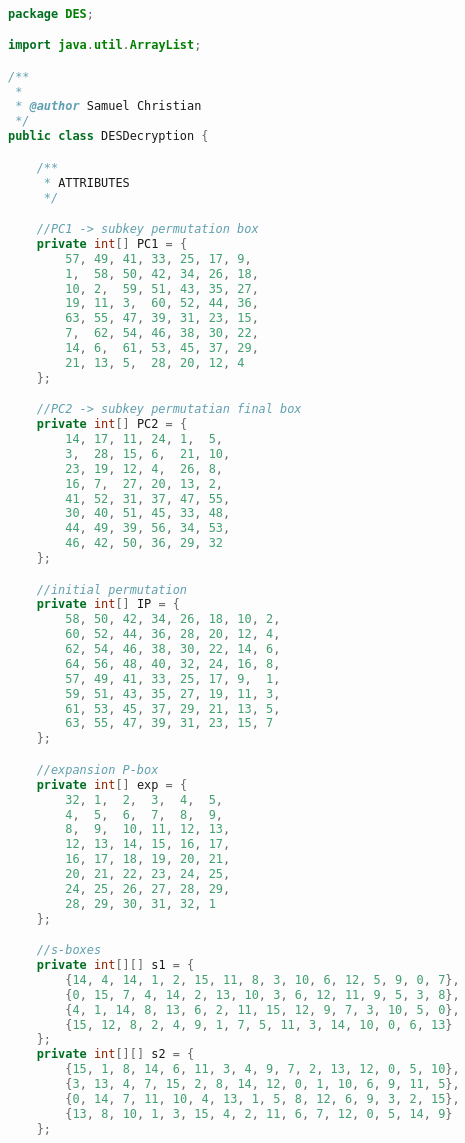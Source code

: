\begin{lstlisting}[language=Java,basicstyle=\tiny,caption=DESDecryption.java]

package DES;

import java.util.ArrayList;

/**
 *
 * @author Samuel Christian
 */
public class DESDecryption {

    /**
     * ATTRIBUTES
     */

    //PC1 -> subkey permutation box
    private int[] PC1 = {
        57, 49, 41, 33, 25, 17, 9,
        1,  58, 50, 42, 34, 26, 18,
        10, 2,  59, 51, 43, 35, 27,
        19, 11, 3,  60, 52, 44, 36,
        63, 55, 47, 39, 31, 23, 15,
        7,  62, 54, 46, 38, 30, 22,
        14, 6,  61, 53, 45, 37, 29,
        21, 13, 5,  28, 20, 12, 4
    };

    //PC2 -> subkey permutatian final box
    private int[] PC2 = {
        14, 17, 11, 24, 1,  5,
        3,  28, 15, 6,  21, 10,
        23, 19, 12, 4,  26, 8,
        16, 7,  27, 20, 13, 2,
        41, 52, 31, 37, 47, 55,
        30, 40, 51, 45, 33, 48,
        44, 49, 39, 56, 34, 53,
        46, 42, 50, 36, 29, 32
    };

    //initial permutation
    private int[] IP = {
        58, 50, 42, 34, 26, 18, 10, 2,
        60, 52, 44, 36, 28, 20, 12, 4,
        62, 54, 46, 38, 30, 22, 14, 6,
        64, 56, 48, 40, 32, 24, 16, 8,
        57, 49, 41, 33, 25, 17, 9,  1,
        59, 51, 43, 35, 27, 19, 11, 3,
        61, 53, 45, 37, 29, 21, 13, 5,
        63, 55, 47, 39, 31, 23, 15, 7
    };

    //expansion P-box
    private int[] exp = {
        32, 1,  2,  3,  4,  5,
        4,  5,  6,  7,  8,  9,
        8,  9,  10, 11, 12, 13,
        12, 13, 14, 15, 16, 17,
        16, 17, 18, 19, 20, 21,
        20, 21, 22, 23, 24, 25,
        24, 25, 26, 27, 28, 29,
        28, 29, 30, 31, 32, 1
    };

    //s-boxes
    private int[][] s1 = {
        {14, 4, 14, 1, 2, 15, 11, 8, 3, 10, 6, 12, 5, 9, 0, 7},
        {0, 15, 7, 4, 14, 2, 13, 10, 3, 6, 12, 11, 9, 5, 3, 8},
        {4, 1, 14, 8, 13, 6, 2, 11, 15, 12, 9, 7, 3, 10, 5, 0},
        {15, 12, 8, 2, 4, 9, 1, 7, 5, 11, 3, 14, 10, 0, 6, 13}
    };
    private int[][] s2 = {
        {15, 1, 8, 14, 6, 11, 3, 4, 9, 7, 2, 13, 12, 0, 5, 10},
        {3, 13, 4, 7, 15, 2, 8, 14, 12, 0, 1, 10, 6, 9, 11, 5},
        {0, 14, 7, 11, 10, 4, 13, 1, 5, 8, 12, 6, 9, 3, 2, 15},
        {13, 8, 10, 1, 3, 15, 4, 2, 11, 6, 7, 12, 0, 5, 14, 9}
    };


\end{lstlisting}
